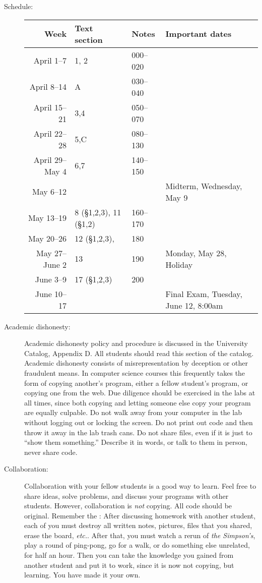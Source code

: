 \documentclass{article}
\begin{document}
\begin{description}
\item [Schedule:]\mbox{}

\begin{tabular}{r|lll}                      
     Week & Text section & Notes & Important dates \\\hline  
     April 1--7&  1, 2 & 000--020 \\
     April 8--14& A  & 030--040\\
     April 15--21 & 3,4 & 050--070 \\
     April 22--28 & 5,C & 080--130 \\
     April 29--May 4 & 6,7 & 140--150 & \\
     May 6--12 &&& Midterm, Wednesday, May 9\\
     May 13--19 &  8 (\S 1,2,3), 11 (\S 1,2) & 160--170 \\ 
     May 20--26 &  12 (\S 1,2,3), & 180 \\
     May 27--June 2 & 13& 190 & Monday, May 28, Holiday\\
     June 3--9 &17 (\S 1,2,3)& 200 \\
     June 10--17 &&&  Final Exam, Tuesday, June 12, 8:00am \\
\end{tabular}


\item [Academic dishonesty:] Academic dishonesty policy and
  procedure is discussed in the University Catalog, Appendix D.  All
  students should read this section of the catalog.  Academic
  dishonesty consists of misrepresentation by deception or other
  fraudulent means.  In computer science courses this frequently takes
  the form of copying another's program, either a fellow student's
  program, or copying one from the web.  Due diligence should be
  exercised in the labs at all times, since both copying and letting
  someone else copy your program are equally culpable.  Do not walk
  away from your computer in the lab without logging out or locking
  the screen.  Do not print out code and then throw it away in the lab
  trash cans. Do not share files, even if it is just to ``show them
  something.''  Describe it in words, or talk to them in person, never
  share code.

\item [Collaboration:] Collaboration with your fellow students is
  a good way to learn.  Feel free to share ideas, solve problems, and
  discuss your programs with other students.  However, collaboration
  is {\em not} copying.  All code should be original.  Remember the
  : After discussing homework with
  another student, each of you must destroy all written notes,
  pictures, files that you shared, erase the board, {\em
    etc.}.  After that, you must watch a rerun of {\em the Simpson's},
  play a round of ping-pong, go for a walk, or do something else
  unrelated, for half an hour.  Then you can take the knowledge you
  gained from another student and put it to work, since it is now not
  copying, but learning.  You have made it your own.

\end{description}
\end{document}
